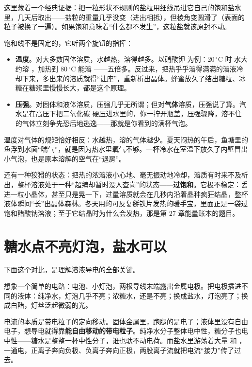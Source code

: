 这里藏着一个经典证据：把一粒形状不规则的盐粒用细线吊进它自己的饱和盐水里，几天后取出——盐粒的重量几乎没变（进出相抵），但棱角变圆滑了（表面的粒子被换了一遍）。如果饱和意味着“什么都不发生”，这粒盐就该原封不动。

饱和线不是固定的，它听两个旋钮的指挥：

\begin{itemize}[itemsep=2pt]
\item \textbf{温度}。对大多数固体溶质，水越热，溶得越多。以硝酸钾  为例：$20\,^{\circ}\mathrm{C}$ 时  水大约溶 ，加热到 $80\,^{\circ}\mathrm{C}$ 能溶 ——五倍多。反过来，把热乎乎溶得满满的溶液冷却下来，多出来的溶质就得“让座”，重新析出晶体。蜂蜜放久了结出糖粒、冰糖在糖浆里慢慢长大，都是这个原理。
\item \textbf{压强}。对固体和液体溶质，压强几乎无所谓；但对\textbf{气体}溶质，压强说了算。汽水是在高压下把二氧化碳  硬压进水里的，你一拧开瓶盖，压强骤降，溶不住的气体立刻争先恐后地逃逸——那就是你看到的满杯气泡。
\end{itemize}

温度对气体的规矩恰好相反：水越热，溶的气体越\textbf{少}。夏天闷热的午后，鱼塘里的鱼浮到水面“喘气”，就是因为热水里氧气不够。一杯冷水在室温下放久了内壁冒出小气泡，也是原本溶解的空气在“退房”。

还有一种狡猾的状态：把热的浓溶液小心地、毫无振动地冷却，溶质有时来不及析出，整杯溶液处于一种“超编却暂时没人查岗”的状态——\textbf{过饱和}。它极不稳定：丢进一粒小晶体，甚至只是晃一下，过量溶质就会在几秒内沿着晶种疯狂结晶，整杯液体瞬间“长”出晶体森林。冬天用的可反复掰铁片发热的暖手宝，里面正是一袋过饱和醋酸钠溶液；至于它结晶时为什么会发热，那是第 27 章能量账本的题目。

\section{糖水点不亮灯泡，盐水可以}

下面这个对比，是理解溶液导电的全部关键。

想象一个简单的电路：电池、小灯泡，两根导线末端露出金属电极。把电极插进不同的液体：纯净水，灯泡几乎不亮；浓糖水，还是不亮；换成盐水，灯泡亮了；换成白醋，灯丝泛起微弱的光。

电流的本质是带电粒子的定向移动。固体金属里，跑腿的是电子；液体里没有自由电子，想导电就得靠\textbf{能自由移动的带电粒子}。纯净水分子整体电中性，糖分子也电中性——糖水是整整一杯中性分子，谁也驮不动电荷。而盐水里游荡着大量  和 ，一通电，正离子奔向负极、负离子奔向正极，两股离子流就把电流“接力”传了过去。

